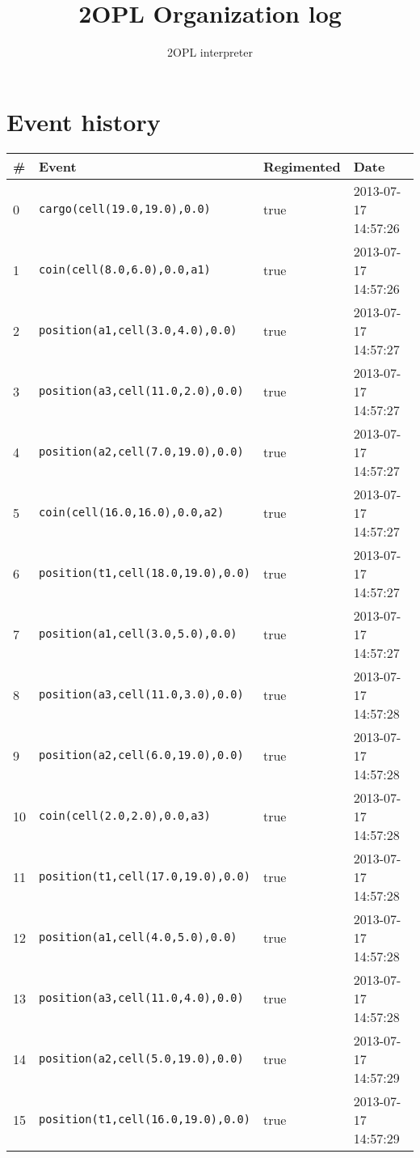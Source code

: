 \documentclass[11pt]{article}\usepackage[utf8]{inputenc}\usepackage{geometry}
\title{2OPL Organization log}
\author{2OPL interpreter}
\begin{document}
\maketitle
\tableofcontents

\section{Event history}

\begin{table}[ht]
\centering 
\begin{tabular}{l l l l} 
\textbf{\#} & \textbf{Event} & \textbf{Regimented} & \textbf{Date} \\ [0.5ex] 
\hline
0&\texttt{cargo(cell(19.0,19.0),0.0)}&true&2013-07-17 14:57:26\\ [1ex] \hline
1&\texttt{coin(cell(8.0,6.0),0.0,a1)}&true&2013-07-17 14:57:26\\ [1ex] \hline
2&\texttt{position(a1,cell(3.0,4.0),0.0)}&true&2013-07-17 14:57:27\\ [1ex] \hline
3&\texttt{position(a3,cell(11.0,2.0),0.0)}&true&2013-07-17 14:57:27\\ [1ex] \hline
4&\texttt{position(a2,cell(7.0,19.0),0.0)}&true&2013-07-17 14:57:27\\ [1ex] \hline
5&\texttt{coin(cell(16.0,16.0),0.0,a2)}&true&2013-07-17 14:57:27\\ [1ex] \hline
6&\texttt{position(t1,cell(18.0,19.0),0.0)}&true&2013-07-17 14:57:27\\ [1ex] \hline
7&\texttt{position(a1,cell(3.0,5.0),0.0)}&true&2013-07-17 14:57:27\\ [1ex] \hline
8&\texttt{position(a3,cell(11.0,3.0),0.0)}&true&2013-07-17 14:57:28\\ [1ex] \hline
9&\texttt{position(a2,cell(6.0,19.0),0.0)}&true&2013-07-17 14:57:28\\ [1ex] \hline
10&\texttt{coin(cell(2.0,2.0),0.0,a3)}&true&2013-07-17 14:57:28\\ [1ex] \hline
11&\texttt{position(t1,cell(17.0,19.0),0.0)}&true&2013-07-17 14:57:28\\ [1ex] \hline
12&\texttt{position(a1,cell(4.0,5.0),0.0)}&true&2013-07-17 14:57:28\\ [1ex] \hline
13&\texttt{position(a3,cell(11.0,4.0),0.0)}&true&2013-07-17 14:57:28\\ [1ex] \hline
14&\texttt{position(a2,cell(5.0,19.0),0.0)}&true&2013-07-17 14:57:29\\ [1ex] \hline
15&\texttt{position(t1,cell(16.0,19.0),0.0)}&true&2013-07-17 14:57:29\\ [1ex] \hline

\end{tabular}
\end{table}
\end{document}
